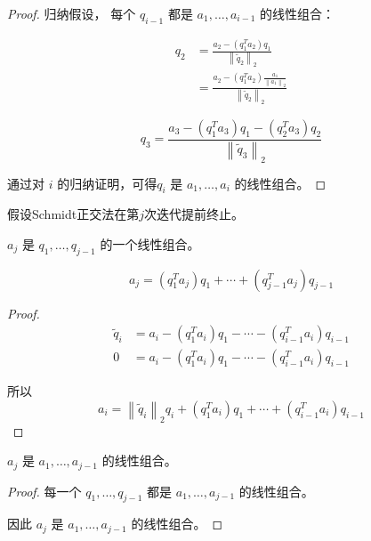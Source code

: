 \begin{proof}
    归纳假设， 每个 $ q_{i-1} $ 都是 $ a_{1}, \ldots, a_{i-1} $ 的线性组合：

    \begin{equation} \begin{aligned}q_{2}&= \frac{a_{2}-\left(q_{1}^{T} a_{2}\right) q_{1}}{\left\|\tilde{q}_{2}\right\|_{2}}
        \\ &=
        \frac{a_{2}-\left(q_{1}^{T} a_{2}\right) \frac{ a_{1} }{\left\|a_{1}\right\|_{2}} }{\left\|\tilde{q}_{2}\right\|_{2}}
    \end{aligned} \end{equation}

\begin{equation} q_{3}=
\frac{a_{3}-\left(q_{1}^{T} a_{3}\right) q_{1}-\left(q_{2}^{T} a_{3}\right) q_{2}}{\left\|\tilde{q}_{3}\right\|_2 }  \end{equation}

通过对 $ i $ 的归纳证明，可得$ q_{i} $ 是 $ a_{1}, \ldots, a_{i} $ 的线性组合。
\end{proof}


假设Schmidt正交法在第$j$次迭代提前终止。

\begin{corollary}
    $ a_{j} $ 是 $ q_{1}, \ldots, q_{j-1} $ 的一个线性组合。

\begin{equation} a_{j}=\left(q_{1}^{T} a_{j}\right) q_{1}+\cdots+\left(q_{j-1}^{T} a_{j}\right) q_{j-1} \end{equation}
\end{corollary}


\begin{proof}
    \begin{equation}\begin{aligned}
        \widetilde{q}_{i} &=a_{i}-\left(q_{1}^{T} a_{i}\right) q_{1}-\cdots-\left(q_{i-1}^{T} a_{i}\right) q_{i-1} \\
        0 &=a_{i}-\left(q_{1}^{T} a_{i}\right) q_{1}-\cdots-\left(q_{i-1}^{T} a_{i}\right) q_{i-1}
    \end{aligned}\end{equation}

    所以
    \begin{equation} a_{i}=\left\|\tilde{q}_{i}\right\|_{2} q_{i}+\left(q_{1}^{T} a_{i}\right) q_{1}+\cdots+\left(q_{i-1}^{T} a_{i}\right) q_{i-1} \end{equation}
\end{proof}

\begin{corollary}
    $ a_{j} $ 是 $ a_{1}, \ldots, a_{j-1} $ 的线性组合。
\end{corollary}

\begin{proof}
    每一个 $ q_{1}, \ldots, q_{j-1} $ 都是 $ a_{1}, \ldots, a_{j-1} $ 的线性组合。

    因此 $ a_{j} $ 是 $ a_{1}, \ldots, a_{j-1} $ 的线性组合。
\end{proof}
